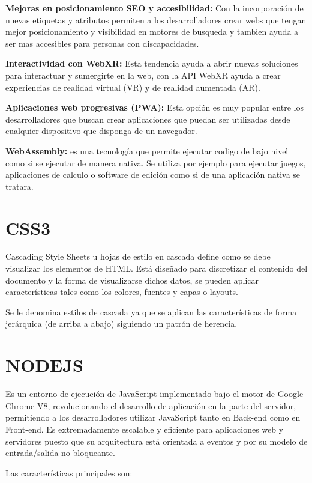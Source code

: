 \documentclass[a4paper, 12pt]{book}
\begin{document}
\textbf{Mejoras en posicionamiento SEO y accesibilidad:} Con la incorporación de nuevas etiquetas y atributos permiten a los desarrolladores crear webs que tengan mejor posicionamiento y visibilidad en motores de busqueda y tambien ayuda a ser mas accesibles para personas con discapacidades.

\textbf{Interactividad con WebXR:} Esta tendencia ayuda a abrir nuevas soluciones para interactuar y sumergirte en la web, con la API WebXR ayuda a crear experiencias de realidad virtual (VR) y de realidad aumentada (AR).

\textbf{Aplicaciones web progresivas (PWA):} Esta opción es muy popular entre los desarrolladores que buscan crear aplicaciones que puedan ser utilizadas desde cualquier dispositivo que disponga de un navegador.

\textbf{WebAssembly:} es una tecnología que permite ejecutar codigo de bajo nivel como si se ejecutar de manera nativa. Se utiliza por ejemplo para ejecutar juegos, aplicaciones de calculo o software de edición como si de una aplicación nativa se tratara.

\section{CSS3}
Cascading Style Sheets u hojas de estilo en cascada define como se debe visualizar los elementos de HTML. Está diseñado para discretizar el contenido del documento y la forma de visualizarse dichos datos, se pueden aplicar características tales como los colores, fuentes y capas o layouts.

Se le denomina estilos de cascada ya que se aplican las características de forma jerárquica (de arriba a abajo) siguiendo un patrón de herencia.

\section{NODEJS}

Es un entorno de ejecución de JavaScript implementado bajo el motor de Google Chrome V8, revolucionando el desarrollo de aplicación en la parte del servidor, permitiendo a los desarrolladores utilizar JavaScript tanto en Back-end como en Front-end. Es extremadamente escalable y eficiente para aplicaciones web y servidores puesto que su arquitectura está orientada a eventos y por su modelo de entrada/salida no bloqueante.

Las características principales son:
\end{document}
